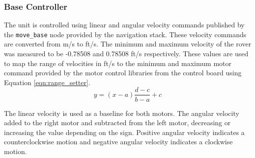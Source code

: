 \documentclass{article}
\begin{document}
          \subsubsection{Base Controller}
          The unit is controlled using linear and angular velocity commands published by the \verb|move_base| node provided by the navigation stack. These velocity commands are converted from m/s to ft/s. The minimum and maximum velocity of the rover was measured to be -0.78508 and 0.78508 ft/s respectively. These values are used to map the range of velocities in ft/s to the minimum and maximum motor command provided by the motor control libraries from the control board \cite{pololu} using Equation \ref{eqn:range_setter}.
          \begin{equation}
            y = (x-a)\frac{d-c}{b-a}+c
          \label{eqn:range_setter}
          \end{equation}
          \par The linear velocity is used as a baseline for both motors. The angular velocity added to the right motor and subtracted from the left motor, decreasing or increasing the value depending on the sign. Positive angular velocity indicates a counterclockwise motion and negative angular velocity indicates a clockwise motion.
\end{document}
